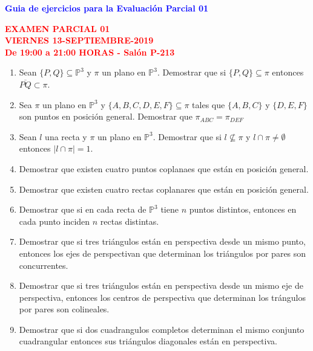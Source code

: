 \documentclass[12pts]{report}
\newcommand{\p}{\mathbb P}
\begin{document}
\begin{center}
\textcolor{blue}{\textbf{\large Guia de ejercicios para la Evaluación Parcial 01 }}\\
\vspace{0.5 cm}
\end{center}


\begin{center}
\textcolor{red}{\textbf{\large EXAMEN PARCIAL 01 \\ VIERNES
13-SEPTIEMBRE-2019\\ De 19:00 a 21:00 HORAS - Salón P-213}}
\end{center}

\begin{enumerate}
\item Sean $\{P,Q\} \subseteq \p^3$ y $\pi$ un plano en $\p^3$. Demostrar que si $\{P,Q\} \subseteq \pi$ entonces $\overline{PQ}\subset \pi$.

\item Sea $\pi$ un plano en $\p^3$ y $\{A,B,C,D,E,F\} \subseteq \pi$ tales que $\{A,B,C\}$ y $\{D,E,F\}$ son puntos en posición general. Demostrar que $\pi_{ABC}=\pi_{DEF}$

 \item Sean $l$ una recta y $\pi$ un plano en $\p^3$. Demostrar que si $l \not\subseteq \pi$ y $l \cap \pi \neq \emptyset$ entonces $|l\cap \pi|= 1$.

\item Demostrar que existen cuatro puntos coplanaes que están en posición general.

\item Demostrar que existen cuatro rectas coplanares que están en posición general.

\item Demostrar que si en cada recta de $\p^3$ tiene $n$ puntos distintos, entonces en cada punto inciden $n$ rectas distintas.

\item Demostrar que si tres triángulos están en perspectiva desde un mismo punto, entonces los ejes de perspectivan que determinan los triángulos por pares son concurrentes.

\item Demostrar que si tres triángulos están en perspectiva desde un mismo eje de perspectiva, entonces los centros de perspectiva que determinan los trángulos por pares son colineales.

\item Demostrar que si dos cuadrangulos completos determinan el mismo conjunto cuadrangular entonces sus triángulos diagonales están en perspectiva.
\end{enumerate}
\end{document}

